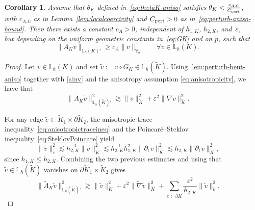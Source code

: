 \documentclass[a4paper,twoside,10pt]{article}
\newtheorem{corollary}[theorem]{Corollary}
\newcommand{\LKh}{\mathbb{L}_h(K)}
\newcommand{\eps}{\varepsilon}
\numberwithin{equation}{section}
\newcommand{\Vh}{\mathbb{V}_{\! h}}
\newcommand{\Kt}{\widetilde{K}}
\newcommand{\hKot}{h_{1,K}}
\newcommand{\hKtt}{h_{2,K}}
\begin{document}
	\begin{corollary}\label{cor:localcoercivity-physical}
	Assume that  $\theta_K$ defined in~\eqref{eq:thetaK-aniso} satisfies
	$ \theta_K<\frac{c_{A,0}}{C_{\rm pert}}$, 	
		with  $c_{A,0}$ as in Lemma~\ref{lem:localcoercivity} and $C_{\rm pert}>0$ as in~\eqref{eq:perturb-aniso-bound}.
	Then there exists a constant $c_A>0$, independent of $\hKot$, $\hKtt$, and~$\eps$, but depending on the uniform geometric constants in~\eqref{eq:GK} and on $p$, such that
	\begin{equation*}
	\|A_K v\|_{\LKh'} \ge c_A \|v\|_{\Vh} \qquad\forall v\in \LKh.
	\end{equation*}
	\end{corollary}
	\begin{proof}
	Let $v\in \LKh$ and set $\tilde v:=v\circ G_K\in \mathbb L_h(\Kt)$.
	Using \cref{lem:perturb-bent-aniso} together with \eqref{ainv} and the anisotropy assumption \eqref{eq:anisotropicity}, we have that 
	\begin{equation*}
	\|\widetilde A_K \tilde v\|_{\mathbb L_h(\Kt)'}^2
	\gtrsim
	\|\tilde v\|_{\Kt}^2+\eps^2\|\widetilde\nabla \tilde v\|_{\Kt}^2.
	\end{equation*}
	
	For any 
	edge $\tilde e\subset \Kt_1\times \partial \Kt_2$, the anisotropic trace inequality~\eqref{eq:anisotropictraceineq}
	and the Poincar\'e--Steklov inequality~\eqref{eq:SteklovPoincare} yield
	\begin{equation*}
	\|\tilde v\|_{\tilde e}^2
	\lesssim
	\hKtt^{-1}\|\tilde v\|_{\Kt}^2
	\lesssim
	\hKtt^{-1}\hKot^2\|\partial_1 \tilde v\|_{\Kt}^2
	\lesssim
	\hKtt \| \partial_1 \tilde v\|_{\Kt}^2,
	\end{equation*}
	since $\hKot\le \hKtt$.
	Combining the two previous estimates and using that  $\tilde v\in \mathbb L_h(\Kt)$ vanishes on
			$\partial \Kt_1\times \Kt_2$ gives
	\begin{equation}\label{eq:pullback-DG}
	\|\widetilde A_K \tilde v\|_{\mathbb L_h(\Kt)'}^2
	\gtrsim
	\|\tilde v\|_{\Kt}^2
	+\eps^2\|\widetilde\nabla \tilde v\|_{\Kt}^2
	+\sum_{\tilde e\subset\partial\Kt}
	\frac{\eps^2}{
	\hKtt}\|\tilde v\|_{\tilde e}^2.
	\end{equation}
	

\end{proof}
\end{document}
